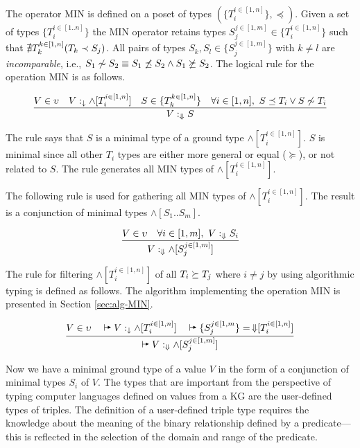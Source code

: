 \documentclass[runningheads]{llncs}
\newcommand{\darr}{\downarrow}
\newcommand{\Darr}{\Downarrow}
\newcommand{\vdasharr}{%
    \mathrel{%
        \vdash\hspace*{-5pt}%
        \raisebox{2.3pt}{\scalebox{.5}{\(\blacktriangleright\)}}%
    }%
}\newcommand{\D}{{\Delta}}
\begin{document}
The operator MIN is defined on a poset of types
$(\{T_i^{i\in[1,n]}\},\preceq)$. Given a set of types $\{T_i^{i\in[1..n]}\}$
the MIN operator retains types $S_j^{j\in[1,m]}\in\{T_i^{i\in[1,n]}\}$
such that ${\nexists}\/T_k^{k\in[1,n]}(T_k\prec\/S_j)$. All pairs of
types $S_k,S_l\in\{S_j^{j\in[1,m]}\}$ with $k\not=l$ are
\emph{incomparable}, i.e.,
$S_1\not\sim\/S_2\equiv\/S_1\not\preceq\/S_2\land\/S_1\not\succeq\/S_2$.
The logical rule for the operation MIN is as follows.

\begin{equation}
\label{rul:min}
\dfrac{V\in\upsilon\quad\/V:_\darr\land[T_i^{i\in[1,n]}]\quad\/S\in\/\{T_k^{k\in[1,n]}\}\quad\forall\/i\in[1,n],\ S\preceq\/T_i\lor\/S\not\sim\/T_i}
      {V:_{\Darr}S}
\end{equation}

The rule says that $S$ is a minimal type of a ground type
$\land[T_i^{i\in[1,n]}]$. $S$ is minimal since all other $T_i$ types are
either more general or equal ($\succeq$), or not related to $S$. The
rule generates all MIN types of $\land[T_i^{i\in[1,n]}]$.

The following rule is used for gathering all MIN types of
$\land[T_i^{i\in[1,n]}]$. The result is a conjunction of minimal types
$\land[S_1..S_m]$.

\begin{equation}
\label{rul:min-gather}
\dfrac{V\in\upsilon\quad\forall\/i\in[1,m],\ V:_\Darr\/S_i}
      {V:_{\Darr}\land[S_j^{j\in[1,m]}]}
\end{equation}


The rule for filtering $\land[T_i^{i\in[1,n]}]$ of all
$T_i\succeq\/T_j$ where $i\not=j$ by using algorithmic typing is
defined as follows. The algorithm implementing the operation MIN is
presented in Section \ref{sec:alg-MIN}.

\begin{equation}
\label{rul:alg-min}
\dfrac{V\in\upsilon\quad\vdasharr\/V:_\darr\land[T_i^{i\in[1,n]}]\quad\vdasharr\/\{S_j^{j\in[1,m}\}=\,\Darr\kern -3pt[T_i^{i\in[1,n]}]}
{\vdasharr\/V:_{\Darr}\land\/[S_j^{j\in[1,m]}]}
\end{equation}

Now we have a minimal ground type of a value $V$ in the form of a
conjunction of minimal types $S_i$ of $V$. The types that are
important from the perspective of typing computer languages defined on
values from a KG are the user-defined types of triples. The definition
of a user-defined triple type requires the knowledge about the meaning
of the binary relationship defined by a predicate---this is reflected
in the selection of the domain and range of the predicate.
\end{document}
